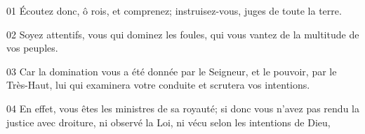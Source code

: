 01 Écoutez donc, ô rois, et comprenez; instruisez-vous, juges de toute la terre.

02 Soyez attentifs, vous qui dominez les foules, qui vous vantez de la multitude de vos peuples.

03 Car la domination vous a été donnée par le Seigneur, et le pouvoir, par le Très-Haut, lui qui examinera votre conduite et scrutera vos intentions.

04 En effet, vous êtes les ministres de sa royauté; si donc vous n’avez pas rendu la justice avec droiture, ni observé la Loi, ni vécu selon les intentions de Dieu,

